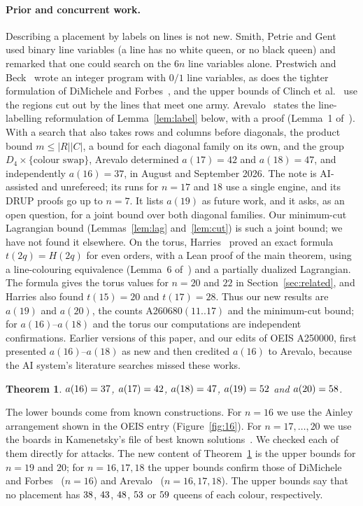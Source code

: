 \documentclass[11pt]{article}
\newtheorem{theorem}{Theorem}[section]
\theoremstyle{remark}
\begin{document}
\paragraph{Prior and concurrent work.} Describing a placement by labels on lines is not new. Smith,
Petrie and Gent~\cite[\S5]{SPG} used binary line variables (a line has no white queen, or no black
queen) and remarked that one could search on the $6n$ line variables alone. Prestwich and Beck~\cite{PB}
wrote an integer program with $0/1$ line variables, as does the tighter formulation of DiMichele and
Forbes~\cite{DF}, and the upper bounds of Clinch et al.~\cite{CDHS}
use the regions cut out by the lines that meet one army. Arevalo~\cite{Arevalo} states the line-labelling
reformulation of Lemma~\ref{lem:label} below, with a proof (Lemma~1 of~\cite{Arevalo}). With a search that also
takes rows and columns before diagonals, the product bound $m\le|R||C|$, a bound for each diagonal family
on its own, and the group $D_4\times\{\text{colour swap}\}$, Arevalo determined $a(17)=42$ and $a(18)=47$, and
independently $a(16)=37$, in August and September 2026. The note is AI-assisted and unrefereed; its runs for $n=17$ and $18$ use a
single engine, and its DRUP proofs go up to $n=7$. It lists $a(19)$ as future work, and it asks, as an open
question, for a joint bound over both diagonal families. Our minimum-cut Lagrangian bound
(Lemmas~\ref{lem:lag} and~\ref{lem:cut}) is such a joint bound; we have not found it elsewhere. On the
torus, Harries~\cite{Harries} proved an exact formula $t(2q)=H(2q)$ for even orders, with a Lean proof of
the main theorem, using a line-colouring equivalence (Lemma~6 of~\cite{Harries}) and a partially dualized
Lagrangian. The formula gives the torus values for $n=20$ and $22$ in Section~\ref{sec:related}, and
Harries also found
$t(15)=20$ and $t(17)=28$. Thus our new results are $a(19)$ and $a(20)$, the counts A260680$(11..17)$ and
the minimum-cut bound; for $a(16)$--$a(18)$ and the torus our computations are independent confirmations.
Earlier versions of this paper, and our edits of OEIS A250000, first presented $a(16)$--$a(18)$ as new and
then credited $a(16)$ to Arevalo, because the AI system's literature searches missed these works.

\begin{theorem}\label{thm:main}
$a(16)=37$, $a(17)=42$, $a(18)=47$, $a(19)=52$ and
$a(20)=58$.
\end{theorem}

The lower bounds come from known constructions. For $n=16$ we use the Ainley arrangement shown in the
OEIS entry (Figure~\ref{fig:16}). For $n=17,\dots,20$ we use the boards in Kamenetsky's file of best known
solutions~\cite{OEIS}. We checked each of them directly for attacks. The new content of
Theorem~\ref{thm:main} is the upper bounds for $n=19$ and $20$; for $n=16,17,18$ the upper bounds confirm
those of DiMichele and Forbes~\cite{DF} ($n=16$) and Arevalo~\cite{Arevalo} ($n=16,17,18$). The upper bounds say that no placement has $38$, $43$, $48$, $53$ or
$59$ queens of each colour, respectively.
\end{document}
